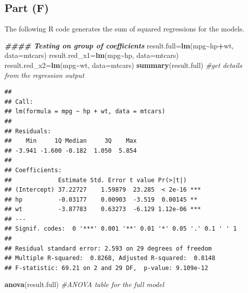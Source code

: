 \documentclass[
]{article}
\newenvironment{Shaded}{\begin{snugshade}}{\end{snugshade}}
\newcommand{\AttributeTok}[1]{\textcolor[rgb]{0.13,0.29,0.53}{#1}}
\newcommand{\CommentTok}[1]{\textcolor[rgb]{0.56,0.35,0.01}{\textit{#1}}}
\newcommand{\DocumentationTok}[1]{\textcolor[rgb]{0.56,0.35,0.01}{\textbf{\textit{#1}}}}
\newcommand{\FunctionTok}[1]{\textcolor[rgb]{0.13,0.29,0.53}{\textbf{#1}}}
\newcommand{\NormalTok}[1]{#1}
\newcommand{\OtherTok}[1]{\textcolor[rgb]{0.56,0.35,0.01}{#1}}
\newcommand{\SpecialCharTok}[1]{\textcolor[rgb]{0.81,0.36,0.00}{\textbf{#1}}}
\begin{document}
\hypertarget{part-f-1}{%
\subsection{Part (F)}\label{part-f-1}}


The following R code generates the sum of squared regressions for the
models.

\begin{Shaded}
\begin{Highlighting}[]
\DocumentationTok{\#\#\#\# Testing on group of coefficients}
\NormalTok{result.full}\OtherTok{=}\FunctionTok{lm}\NormalTok{(mpg}\SpecialCharTok{\textasciitilde{}}\NormalTok{hp}\SpecialCharTok{+}\NormalTok{wt, }\AttributeTok{data=}\NormalTok{mtcars)}
\NormalTok{result.red\_x1}\OtherTok{=}\FunctionTok{lm}\NormalTok{(mpg}\SpecialCharTok{\textasciitilde{}}\NormalTok{hp, }\AttributeTok{data=}\NormalTok{mtcars)}
\NormalTok{result.red\_x2}\OtherTok{=}\FunctionTok{lm}\NormalTok{(mpg}\SpecialCharTok{\textasciitilde{}}\NormalTok{wt, }\AttributeTok{data=}\NormalTok{mtcars)}
\FunctionTok{summary}\NormalTok{(result.full)    }\CommentTok{\#get details from the regression output}
\end{Highlighting}
\end{Shaded}

\begin{verbatim}
## 
## Call:
## lm(formula = mpg ~ hp + wt, data = mtcars)
## 
## Residuals:
##    Min     1Q Median     3Q    Max 
## -3.941 -1.600 -0.182  1.050  5.854 
## 
## Coefficients:
##             Estimate Std. Error t value Pr(>|t|)    
## (Intercept) 37.22727    1.59879  23.285  < 2e-16 ***
## hp          -0.03177    0.00903  -3.519  0.00145 ** 
## wt          -3.87783    0.63273  -6.129 1.12e-06 ***
## ---
## Signif. codes:  0 '***' 0.001 '**' 0.01 '*' 0.05 '.' 0.1 ' ' 1
## 
## Residual standard error: 2.593 on 29 degrees of freedom
## Multiple R-squared:  0.8268, Adjusted R-squared:  0.8148 
## F-statistic: 69.21 on 2 and 29 DF,  p-value: 9.109e-12
\end{verbatim}

\begin{Shaded}
\begin{Highlighting}[]
\FunctionTok{anova}\NormalTok{(result.full)      }\CommentTok{\#ANOVA table for the full model}
\end{Highlighting}
\end{Shaded}
\end{document}
